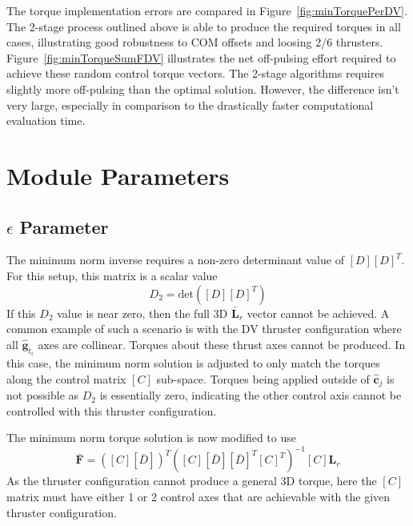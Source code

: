 \documentclass[]{BasiliskReportMemo}
\begin{document}
The torque implementation errors are compared in Figure~\ref{fig:minTorquePerDV}.  The 2-stage process outlined above is able to produce the required torques in all cases, illustrating good robustness to COM offsets and loosing 2/6 thrusters.  Figure~\ref{fig:minTorqueSumFDV} illustrates the net off-pulsing effort required to achieve these random control torque vectors.  The 2-stage algorithms requires slightly more off-pulsing than the optimal solution.  However, the difference isn't very large, especially in comparison to the drastically faster computational evaluation time.  





















\section{Module Parameters}
\subsection{$\epsilon$ Parameter}
The minimum norm inverse requires a non-zero determinant value of $[D][D]^{T}$.  For this setup, this matrix is a scalar value
\begin{equation}
	D_{2} = \text{det}([D][D]^{T})
\end{equation}
If this $D_{2}$ value is near zero, then the full 3D $\bar{\bm L}_{r}$ vector cannot be achieved.  A common example of such a scenario is with the DV thruster configuration where all $\hat{\bm g}_{t_{i}}$ axes are collinear.  Torques about these thrust axes cannot be produced.  In this case, the minimum norm solution is adjusted to only match the torques along the control matrix $[C]$ sub-space.  Torques being applied outside of $\hat{\bm c}_{j}$ is not possible as $D_{2}$ is essentially zero, indicating the other control axis cannot be controlled with this thruster configuration.  

The minimum norm torque solution is now modified to use
\begin{equation}
	\bar{\bm F} = ([C][\bar D])^{T}( [C][\bar D][\bar D]^{T}[C]^{T})^{-1} [C] {\bm L}_{r}
\end{equation}
As the thruster configuration cannot produce a general 3D torque, here the $[C]$ matrix must have either 1 or 2 control axes that are achievable with the given thruster configuration.  
\end{document}
